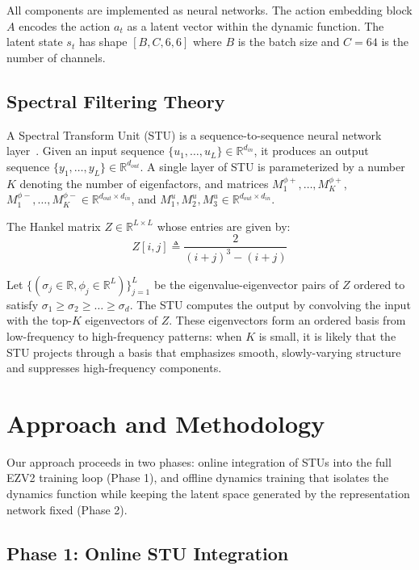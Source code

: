 \documentclass[10pt,twocolumn]{IEEEtran}
\begin{document}
All components are implemented as neural networks. The action embedding block $A$ encodes the action $a_t$ as a latent vector within the dynamic function. The latent state $s_t$ has shape $[B, C, 6, 6]$ where $B$ is the batch size and $C = 64$ is the number of channels.

\subsection{Spectral Filtering Theory}

A Spectral Transform Unit (STU) is a sequence-to-sequence neural network layer~\cite{agarwal2023spectral}. Given an input sequence $\{u_1, \ldots, u_L\} \in \mathbb{R}^{d_{in}}$, it produces an output sequence $\{y_1, \ldots, y_L\} \in \mathbb{R}^{d_{out}}$. A single layer of STU is parameterized by a number $K$ denoting the number of eigenfactors, and matrices $M^{\phi+}_1, \ldots, M^{\phi+}_K$, $M^{\phi-}_1, \ldots, M^{\phi-}_K \in \mathbb{R}^{d_{out} \times d_{in}}$, and $M^u_1, M^u_2, M^u_3 \in \mathbb{R}^{d_{out} \times d_{in}}$.

The Hankel matrix $Z \in \mathbb{R}^{L \times L}$ whose entries are given by:
\begin{equation}
Z[i, j] \triangleq \frac{2}{(i + j)^3 - (i + j)}
\end{equation}

Let $\{(\sigma_j \in \mathbb{R}, \phi_j \in \mathbb{R}^L)\}^L_{j=1}$ be the eigenvalue-eigenvector pairs of $Z$ ordered to satisfy $\sigma_1 \geq \sigma_2 \geq \ldots \geq \sigma_d$. The STU computes the output by convolving the input with the top-$K$ eigenvectors of $Z$. These eigenvectors form an ordered basis from low-frequency to high-frequency patterns: when $K$ is small, it is likely that the STU projects through a basis that emphasizes smooth, slowly-varying structure and suppresses high-frequency components.

\section{Approach and Methodology}
\label{sec:approach}

Our approach proceeds in two phases: online integration of STUs into the full EZV2 training loop (Phase 1), and offline dynamics training that isolates the dynamics function while keeping the latent space generated by the representation network fixed (Phase 2).

\subsection{Phase 1: Online STU Integration}
\end{document}
